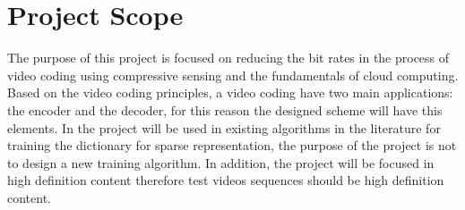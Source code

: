 \section{Project Scope}

The purpose of this project is focused on reducing the bit rates in the process of video coding using compressive sensing and the fundamentals of cloud computing. Based on the video coding principles, a video coding have two main applications: the encoder and the decoder, for this reason the designed scheme will have this elements. In the project will be used in existing algorithms in the literature for training the dictionary for sparse representation, the purpose of the project is not to design a new training algorithm. In addition, the project will be focused in high definition content therefore test videos sequences should be   high definition content.

